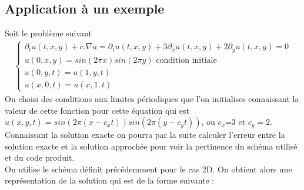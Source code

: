 \documentclass[12pt]{article}
\begin{document}
\subsection{Application à un exemple}
Soit le problème suivant
\begin{eqnarray*}
      \left\{
        \begin{array}{llll}
            \partial_tu(t,x,y)+c.\nabla u=\partial_tu(t,x,y) +3\partial_xu(t,x,y)+2\partial_yu(t,x,y)=0
            \\ u(0,x,y)=sin(2\pi x)sin(2\pi y) \text{ condition initiale}
            \\u(0,y,t)=u(1,y,t)
            \\u(x,0,t)=u(x,1,t)
        \end{array}
    \right .
\end{eqnarray*}
On choisi des conditions aux limites périodiques que l'on initialises connaissant la valeur de cette fonction pour cette équation qui est $u(x,y,t)=sin(2\pi (x-c_xt))sin(2\pi(y-c_yt))$, ou $c_x$=3 et $c_y=2$.
Connaissant la solution exacte on pourra par la suite calculer l'erreur entre la solution exacte et la solution approchée pour voir la pertinence du schéma utilisé et du code produit.
\\On utilise le schéma définit précédemment pour le cas 2D. On obtient alors une représentation de la solution qui est de la forme suivante :
\end{document}
